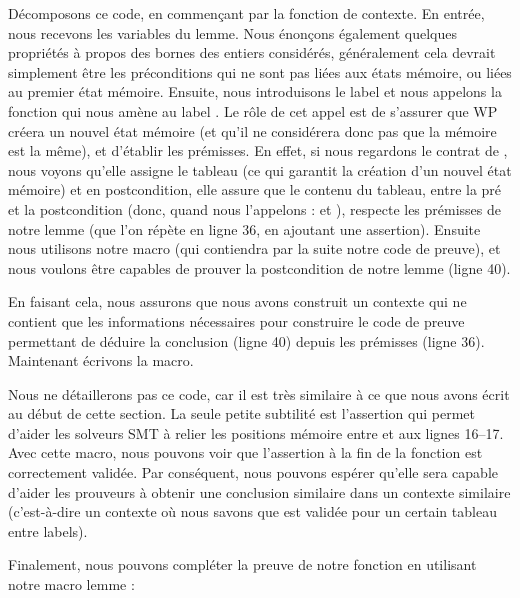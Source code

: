 Décomposons ce code, en commençant par la fonction de contexte. En entrée, nous
recevons les variables du lemme. Nous énonçons également quelques propriétés à
propos des bornes des entiers considérés, généralement cela devrait simplement
être les préconditions qui ne sont pas liées aux états mémoire, ou liées au
premier état mémoire. Ensuite, nous introduisons le label  et nous
appelons la fonction  qui nous amène au label
. Le rôle de cet appel est de s'assurer que WP créera un nouvel
état mémoire (et qu'il ne considérera donc pas que la mémoire est la même), et
d'établir les prémisses. En effet, si nous regardons le contrat de
, nous voyons qu'elle assigne le tableau (ce qui
garantit la création d'un nouvel état mémoire) et en postcondition, elle assure
que le contenu du tableau, entre la pré et la postcondition (donc, quand nous
l'appelons :  et ), respecte les prémisses de notre
lemme (que l'on répète en ligne 36, en ajoutant une assertion). Ensuite nous
utilisons notre macro  (qui contiendra par la suite notre
code de preuve), et nous voulons être capables de prouver la postcondition de
notre lemme (ligne 40).


En faisant cela, nous assurons que nous avons construit un contexte qui ne
contient que les informations nécessaires pour construire le code de preuve
permettant de déduire la conclusion (ligne 40) depuis les prémisses (ligne 36).
Maintenant écrivons la macro.




Nous ne détaillerons pas ce code, car il est très similaire à ce que nous avons
écrit au début de cette section. La seule petite subtilité est l'assertion qui
permet d'aider les solveurs SMT à relier les positions mémoire entre
 et  aux lignes 16--17. Avec cette macro, nous
pouvons voir que l'assertion à la fin de la fonction 
 est correctement validée. Par
conséquent, nous pouvons espérer qu'elle sera capable d'aider les prouveurs à
obtenir une conclusion similaire dans un contexte similaire (c'est-à-dire un
contexte où nous savons que  est validée pour un certain
tableau entre labels).


Finalement, nous pouvons compléter la preuve de notre fonction 
en utilisant notre macro lemme :




